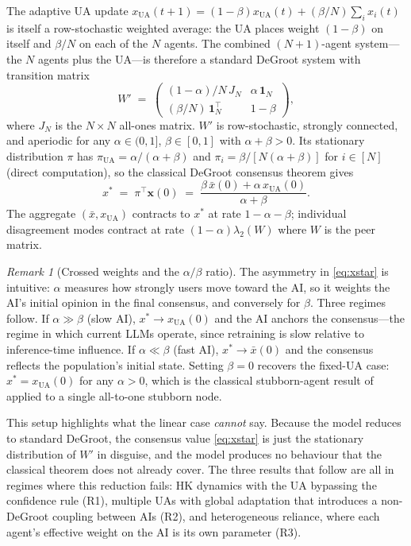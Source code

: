 \documentclass{article}
\theoremstyle{plain}
\theoremstyle{definition}
\theoremstyle{remark}
\newtheorem{remark}[theorem]{Remark}
\newcommand{\bx}{\mathbf{x}}
\newcommand{\bone}{\mathbf{1}}
\newcommand{\xUA}{x_{\mathrm{UA}}}
\newcommand{\xbar}{\bar{x}}
\begin{document}
The adaptive UA update
$\xUA(t+1)=(1-\beta)\xUA(t)+(\beta/N)\sum_i x_i(t)$
is itself a row-stochastic weighted average: the UA places weight
$(1-\beta)$ on itself and $\beta/N$ on each of the $N$ agents.  The
combined $(N+1)$-agent system---the $N$ agents plus the UA---is
therefore a standard DeGroot system with transition matrix
\[
    W' \;=\;
    \begin{pmatrix}
        (1-\alpha)/N\,J_N & \alpha\,\bone_N\\[2pt]
        (\beta/N)\,\bone_N^\top & 1-\beta
    \end{pmatrix},
\]
where $J_N$ is the $N\times N$ all-ones matrix.  $W'$ is row-stochastic,
strongly connected, and aperiodic for any $\alpha\in(0,1]$,
$\beta\in[0,1]$ with $\alpha+\beta>0$.  Its stationary distribution
$\pi$ has $\pi_{\mathrm{UA}}=\alpha/(\alpha+\beta)$ and
$\pi_i=\beta/[N(\alpha+\beta)]$ for $i\in[N]$ (direct computation), so
the classical DeGroot consensus theorem gives
\begin{equation}
    x^* \;=\; \pi^\top \bx(0)
        \;=\; \frac{\beta\,\xbar(0) + \alpha\,\xUA(0)}{\alpha+\beta}.
    \label{eq:xstar}
\end{equation}
The aggregate $(\xbar,\xUA)$ contracts to $x^*$ at rate
$1-\alpha-\beta$; individual disagreement modes contract at rate
$(1-\alpha)\lambda_2(W)$ where $W$ is the peer matrix.

\begin{remark}[Crossed weights and the $\alpha/\beta$ ratio]
\label{rem:ratio}
The asymmetry in \eqref{eq:xstar} is intuitive: $\alpha$ measures how
strongly users move toward the AI, so it weights the AI's initial
opinion in the final consensus, and conversely for $\beta$.  Three
regimes follow.  If $\alpha\gg\beta$ (slow AI), $x^*\to\xUA(0)$ and
the AI anchors the consensus---the regime in which current LLMs
operate, since retraining is slow relative to inference-time
influence.  If $\alpha\ll\beta$ (fast AI), $x^*\to\xbar(0)$ and the
consensus reflects the population's initial state.  Setting $\beta=0$
recovers the fixed-UA case: $x^*=\xUA(0)$ for any $\alpha>0$, which is
the classical stubborn-agent result of \citet{acemoglu2013binary}
applied to a single all-to-one stubborn node.
\end{remark}

This setup highlights what the linear case \emph{cannot} say.  Because
the model reduces to standard DeGroot, the consensus value
\eqref{eq:xstar} is just the stationary distribution of $W'$ in
disguise, and the model produces no behaviour that the classical
theorem does not already cover.  The three results that follow are
all in regimes where this reduction fails: HK dynamics with the UA
bypassing the confidence rule (R1), multiple UAs with global adaptation
that introduces a non-DeGroot coupling between AIs (R2), and
heterogeneous reliance, where each agent's effective weight on the AI
is its own parameter (R3).
\end{document}
